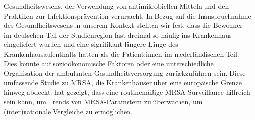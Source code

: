 \documentclass[
]{book}
\begin{document}
Gesundheitswesens, der Verwendung von antimikrobiellen Mitteln und den Praktiken zur Infektionsprävention verursacht. In Bezug auf die Inanspruchnahme des Gesundheitswesens in unserem Kontext stellten wir fest, dass die Bewohner im deutschen Teil der Studienregion fast dreimal so häufig ins Krankenhaus eingeliefert wurden und eine signifikant längere Länge des Krankenhausaufenthalts hatten als die Patient:innen im niederländischen Teil. Dies könnte auf sozioökonomische Faktoren oder eine unterschiedliche Organisation der ambulanten Gesundheitsversorgung zurückzuführen sein. Diese umfassende Studie zu MRSA, die Krankenhäuser über eine europäische Grenze hinweg abdeckt, hat gezeigt, dass eine routinemäßige MRSA-Surveillance hilfreich sein kann, um Trends von MRSA-Parametern zu überwachen, um (inter)nationale Vergleiche zu ermöglichen.
\end{document}
